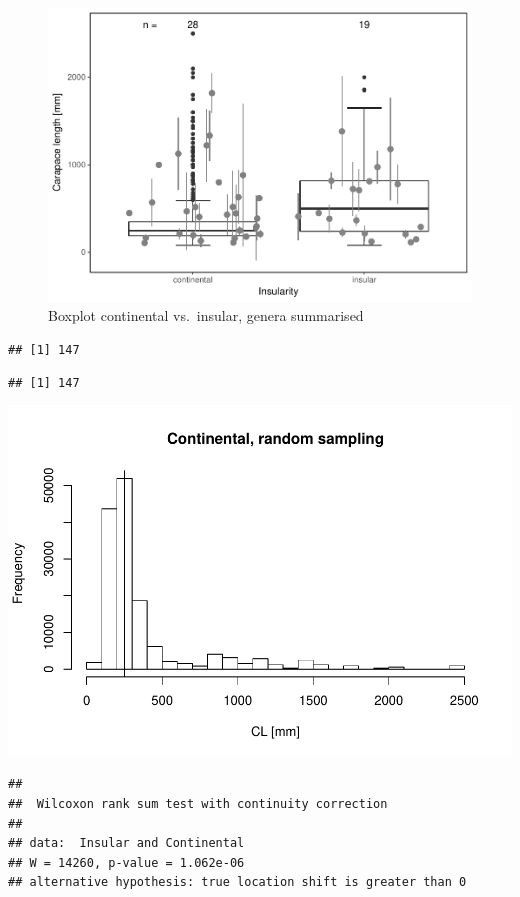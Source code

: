 \documentclass[]{article}
\begin{document}
\begin{figure}[htbp]
\centering
\includegraphics{MA_JJ_files/figure-latex/BPCI-1.pdf}
\caption{Boxplot continental vs.~insular, genera summarised}
\end{figure}

\begin{verbatim}
## [1] 147
\end{verbatim}

\begin{verbatim}
## [1] 147
\end{verbatim}

\includegraphics{MA_JJ_files/figure-latex/RSCI-1.pdf}

\begin{verbatim}
## 
##  Wilcoxon rank sum test with continuity correction
## 
## data:  Insular and Continental
## W = 14260, p-value = 1.062e-06
## alternative hypothesis: true location shift is greater than 0
\end{verbatim}
\end{document}
